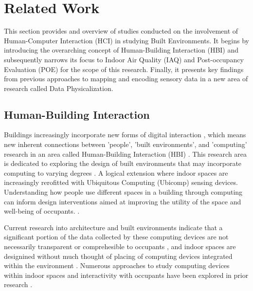\section{Related Work}
\label{sec:related_work}

This section provides and overview of studies conducted on the involvement of Human-Computer Interaction (HCI) in studying Built Environments. It begins by introducing the overarching concept of Human-Building Interaction (HBI) and subsequently narrows its focus to Indoor Air Quality (IAQ) and Post-occupancy Evaluation (POE) for the scope of this research. Finally, it presents key findings from previous approaches to mapping and encoding sensory data in a new area of research called Data Physicalization.

\subsection{Human-Building Interaction}

Buildings increasingly incorporate new forms of digital interaction \cite{pulsipher_towards_2023, margariti_understanding_2023}, which means new inherent connections between 'people', 'built environments', and 'computing' research in an area called Human-Building Interaction (HBI) \cite{alavi_introduction_2019, taherkhani_human-building_2023}. This research area is dedicated to exploring the design of built environments that may incorporate computing to varying degrees \cite{sowles_introducing_2021}.  A logical extension where indoor spaces are increasingly rerofitted with Ubiquitous Computing (Ubicomp) \cite{weiser_computer_1999,bell_yesterdays_2007} sensing devices. Understanding how people use different spaces in a building through computing can inform design interventions aimed at improving the utility of the space and well-being of occupants. \cite{verma_studying_2017}. 

Current research into architecture and built environments indicate that a significant portion of the data collected by these computing devices are not necessarily transparent or comprehesible to occupants \cite{schnadelbach_adaptive_2019}, and indoor spaces are designined without much thought of placing of computing devices integrated within the environment \cite{johansen_temporal_2019, kirsh_architects_2019}. Numerous approaches to study computing devices within indoor spaces and interactivity with occupants have been explored in prior research \cite{bader_windowwall_2019, rogers_ambient_2010}.


